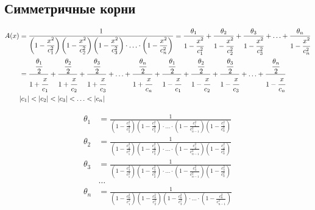 
\subsection{Симметричные корни}

\begin{equation*} \begin{aligned}
A(x) &=
\frac{1}
{
  \left(1 - \displaystyle \frac{x^2}{c_1^2} \right)
  \left(1 - \displaystyle \frac{x^2}{c_2^2} \right)
  \left(1 - \displaystyle \frac{x^2}{c_3^2} \right)
  \cdot \ldots \cdot
  \left(1 - \displaystyle \frac{x^2}{c_n^2} \right)
}
= \frac{\theta_1}{1 - \cfrac{x^2}{c_1^2}}
+ \frac{\theta_2}{1 - \cfrac{x^2}{c_2^2}}
+ \frac{\theta_3}{1 - \cfrac{x^2}{c_3^2}}
+ \ldots
+ \frac{\theta_n}{1 - \cfrac{x^2}{c_n^2}} \\ &
= \frac{\cfrac{\theta_1}{2}}{1 + \cfrac{x}{c_1}}
+ \frac{\cfrac{\theta_2}{2}}{1 + \cfrac{x}{c_2}}
+ \frac{\cfrac{\theta_3}{2}}{1 + \cfrac{x}{c_3}}
+ \ldots
+ \frac{\cfrac{\theta_n}{2}}{1 + \cfrac{x}{c_n}}
+ \frac{\cfrac{\theta_1}{2}}{1 - \cfrac{x}{c_1}}
+ \frac{\cfrac{\theta_2}{2}}{1 - \cfrac{x}{c_2}}
+ \frac{\cfrac{\theta_3}{2}}{1 - \cfrac{x}{c_3}}
+ \ldots
+ \frac{\cfrac{\theta_n}{2}}{1 - \cfrac{x}{c_n}} \\
&|c_1| < |c_2| < |c_3| < \ldots < |c_n| \\
\end{aligned} \end{equation*}

\begin{equation*} \begin{aligned}
\theta_1 &= \frac{1}
{
  \left(1 - \displaystyle \frac{c_1^2}{c_2^2} \right)
  \left(1 - \displaystyle \frac{c_1^2}{c_3^2} \right)
  \cdot \ldots \cdot
  \left(1 - \displaystyle \frac{c_1^2}{c_{n - 1}^2} \right)
  \left(1 - \displaystyle \frac{c_1^2}{c_n^2} \right)
} \\
\theta_2 &= \frac{1}
{
  \left(1 - \displaystyle \frac{c_2^2}{c_1^2} \right)
  \left(1 - \displaystyle \frac{c_2^2}{c_3^2} \right)
  \cdot \ldots \cdot
  \left(1 - \displaystyle \frac{c_2^2}{c_{n - 1}^2} \right)
  \left(1 - \displaystyle \frac{c_2^2}{c_n^2} \right)
} \\
\theta_3 &= \frac{1}
{
  \left(1 - \displaystyle \frac{c_3^2}{c_1^2} \right)
  \left(1 - \displaystyle \frac{c_3^2}{c_2^2} \right)
  \cdot \ldots \cdot
  \left(1 - \displaystyle \frac{c_3^2}{c_{n - 1}^2} \right)
  \left(1 - \displaystyle \frac{c_3^2}{c_n^2} \right)
} \\
&\ldots \\
\theta_n &= \frac{1}
{
  \left(1 - \displaystyle \frac{c_n^2}{c_1^2} \right)
  \left(1 - \displaystyle \frac{c_n^2}{c_2^2} \right)
  \left(1 - \displaystyle \frac{c_n^2}{c_3^2} \right)
  \cdot \ldots \cdot
  \left(1 - \displaystyle \frac{c_n^2}{c_{n - 1}^2} \right)
} \\
\end{aligned} \end{equation*}

